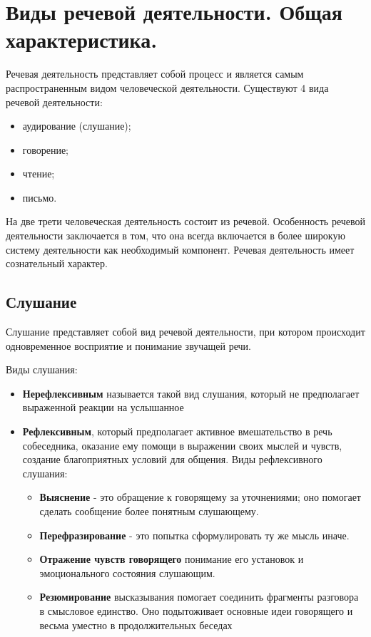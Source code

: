 
\section{Виды речевой деятельности. Общая характеристика.}

Речевая деятельность представляет собой процесс и является самым распространенным видом человеческой
деятельности.
Существуют 4 вида речевой деятельности:
\begin{itemize}
	\item аудирование (слушание);
	\item говорение;
	\item чтение;
	\item письмо.
\end{itemize}
На две трети человеческая деятельность состоит из речевой.
Особенность речевой деятельности заключается в том, что она всегда включается в более широкую систему деятельности как необходимый компонент.
Речевая деятельность имеет сознательный характер.

\subsection{Слушание}
Слушание представляет собой вид речевой деятельности, при котором происходит одновременное восприятие и понимание звучащей речи.

Виды слушания:
\begin{itemize}
	\item \textbf{Нерефлексивным} называется такой вид слушания, который
	не предполагает выраженной реакции на услышанное
	\item \textbf{Рефлексивным}, который предполагает активное
	вмешательство в речь собеседника, оказание ему помощи в выражении своих мыслей и чувств, создание благоприятных условий для
	общения. Виды рефлексивного слушания:
	\begin{itemize}
		\renewcommand{\labelitemi}{--}
		\item \textbf{Выяснение} - это обращение к говорящему за уточнениями; оно помогает сделать сообщение более понятным слушающему.
		\item \textbf{Перефразирование} - это попытка сформулировать ту же
		мысль иначе.
		\item \textbf{Отражение чувств говорящего} понимание его установок и эмоционального состояния слушающим.
		\item \textbf{Резюмирование} высказывания помогает соединить фрагменты разговора в смысловое единство. Оно подытоживает основные идеи г\textsc{}оворящего и весьма уместно в продолжительных беседах
	\end{itemize}
\end{itemize}
